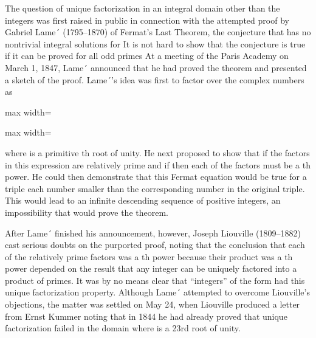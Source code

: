 \documentclass[11pt,oneside]{article}
\begin{document}
\begin{BookBody}


\noindent The question of unique factorization in an integral domain other than the integers was first raised in public in connection with the attempted proof by Gabriel Lame´ (1795–1870) of Fermat’s Last Theorem, the conjecture that  has no nontrivial integral solutions for  It is not hard to show that the conjecture is true if it can be proved for all odd primes  At a meeting of the Paris Academy on March 1, 1847, Lame´ announced that he had proved the theorem and presented a sketch of the proof. Lame´’s idea was first to factor  over the complex numbers as

\begin{center}\begin{adjustbox}{max width=\linewidth}\end{adjustbox}\end{center}

\begin{center}\begin{adjustbox}{max width=\linewidth}\end{adjustbox}\end{center}

\noindent where \BookInline{\alpha } is a primitive th root of unity. He next proposed to show that if the factors in this expression are relatively prime and if  then each of the  factors must be a th power. He could then demonstrate that this Fermat equation would be true for a triple  each number smaller than the corresponding number in the original triple. This would lead to an infinite descending sequence of positive integers, an impossibility that would prove the theorem.

\noindent After Lame´ finished his announcement, however, Joseph Liouville (1809–1882) cast serious doubts on the purported proof, noting that the conclusion that each of the relatively prime factors was a th power because their product was a th power depended on the result that any integer can be uniquely factored into a product of primes. It was by no means clear that “integers” of the form  had this unique factorization property. Although Lame´ attempted to overcome Liouville’s objections, the matter was settled on May 24, when Liouville produced a letter from Ernst Kummer noting that in 1844 he had already proved that unique factorization failed in the domain  where \BookInline{\alpha } is a 23rd root of unity.


\end{BookBody}
\end{document}
